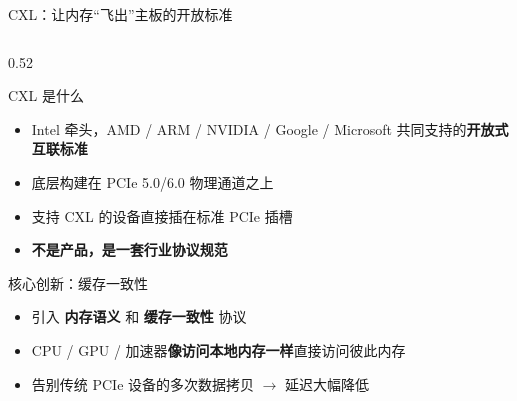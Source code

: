 \documentclass[aspectratio=169, 8pt, UTF8]{ctexbeamer}
\begin{document}
\begin{frame}{CXL：让内存``飞出''主板的开放标准}
  \begin{columns}[T]
    \begin{column}{0.52\textwidth}
      \begin{block}{CXL 是什么}
        \begin{itemize}
          \item Intel 牵头，AMD / ARM / NVIDIA / Google / Microsoft 共同支持的\textbf{开放式互联标准}
          \item 底层构建在 PCIe 5.0/6.0 物理通道之上
          \item 支持 CXL 的设备直接插在标准 PCIe 插槽
          \item \textbf{不是产品，是一套行业协议规范}
        \end{itemize}
      \end{block}

      \vspace{6pt}

      \begin{alertblock}{核心创新：缓存一致性}
        \begin{itemize}
          \item 引入 \textbf{内存语义} 和 \textbf{缓存一致性} 协议
          \item CPU / GPU / 加速器\textbf{像访问本地内存一样}直接访问彼此内存
          \item 告别传统 PCIe 设备的多次数据拷贝 $\to$ 延迟大幅降低
        \end{itemize}
      \end{alertblock}

      \vspace{6pt}


\end{column}
\end{columns}
\end{frame}
\end{document}
